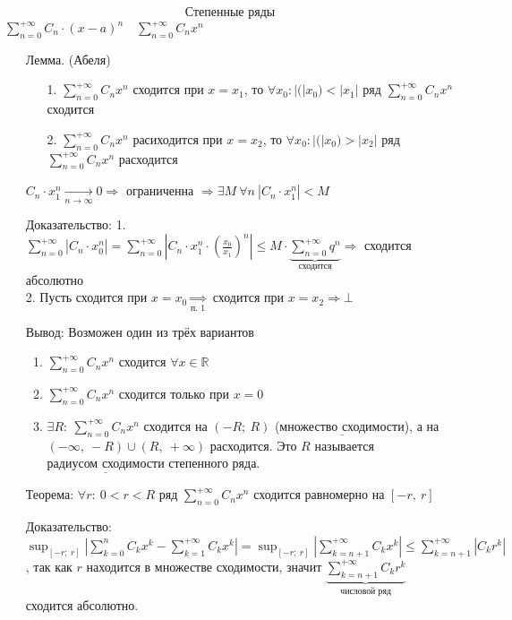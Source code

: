 \documentclass[12pt, letterpaper, twoside]{article}
\newcommand{\Underl}[1]{$\underline{\text{#1}}$}
\newcommand{\DS}{\displaystyle}
\newcommand{\oo}{\infty}
\newcommand{\Abs}[1]{\left| #1 \right|}
\newcommand{\mb}[1]{\mathbb{#1}}
\begin{document}
        \[\text{Степенные ряды}\]
    $\DS \sum_{n = 0}^{+\oo} C_n\cdot (x - a)^n\quad \sum_{n = 0}^{+\oo} C_nx^n$
    \begin{enumerate}
        \item[Лемма.] (Абеля)
        \begin{enumerate}
            \item[1.] $\sum_{n = 0}^{+\oo} C_nx^n$ сходится при $x = x_1$, то $\forall x_0: \Abs(x_0) < \Abs{x_1}$ ряд $\sum_{n = 0}^{+\oo} C_nx^n$ сходится
            \item[2.] $\sum_{n = 0}^{+\oo} C_nx^n$ расиходится при $x = x_2$, то $\forall x_0: \Abs(x_0) > \Abs{x_2}$ ряд $\sum_{n = 0}^{+\oo} C_nx^n$ расходится
        \end{enumerate}
        $C_n\cdot x_1^n \xrightarrow[n\rightarrow \oo]{} 0 \Rightarrow$ ограниченна $\Rightarrow \exists M\ \forall n\ \Abs{C_n\cdot x_1^n} < M$
        \item[Доказательство:] 1. $\DS \sum_{n = 0}^{+\oo} \Abs{C_n\cdot x_0^n} = \sum_{n = 0}^{+\oo} \Abs{C_n \cdot x_1^n \cdot \left( \frac{x_0}{x_1} \right)^n} \leq M\cdot \underset{\text{сходится}}{\underbrace{\sum_{n=  0}^{+\oo}q^n}}\Rightarrow$ сходится абсолютно\\
        2. Пусть сходится при $x = x_0\underset{\text{п. 1}}{\Rightarrow}$ сходится при $x = x_2\Rightarrow \bot$
        \item[Вывод:] Возможен один из трёх вариантов
        \begin{enumerate}
            \item $\sum_{n = 0}^{+\oo} C_nx^n$ сходится $\forall x\in \mb{R}$
            \item $\sum_{n = 0}^{+\oo} C_nx^n$ сходится только при $x = 0$
            \item $\exists R:\ \sum_{n = 0}^{+\oo} C_nx^n$ сходится на $(-R;\ R)$ (\Underl{множество сходимости}), а на $(-\oo,\ -R)\cup(R,\ +\oo)$ расходится. Это $R$ называется \Underl{радиусом сходимости} степенного ряда.
        \end{enumerate}
        \item[Теорема:] $\forall r:\ 0 < r < R$ ряд $\sum_{n = 0}^{+\oo} C_nx^n$ сходится равномерно на $[-r,\ r]$
        \item[Доказательство:] $\DS\sup_{[-r;\ r]} \Abs{\sum_{k = 0}^{n} C_k x^k - \sum_{k = 1}^{+\oo}C_kx^k} = \sup_{[-r;\ r]}\Abs{\sum_{k = n+1}^{+\oo} C_k x^k} \leq \sum_{k = n+1}^{+\oo}\Abs{C_k r^k}$, так как $r$ находится в множестве сходимости, значит $\underset{\text{числовой ряд}}{\underbrace{\sum_{k = n + 1}^{+\oo} C_k r^k}}$ сходится абсолютно.

\end{enumerate}
\end{document}

